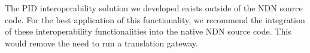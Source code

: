 
The PID interoperability solution we developed exists outside of the NDN source code. For the best application of this functionality, we recommend the integration of these interoperability functionalities into the native NDN source code. This would remove the need to run a translation gateway.


